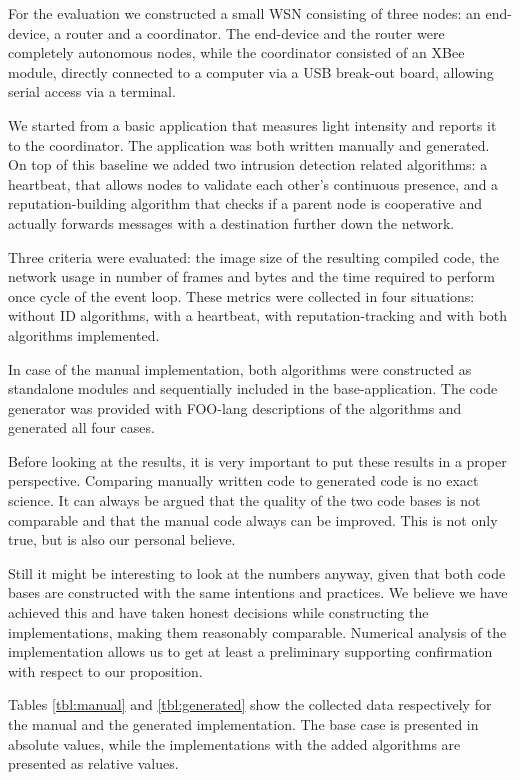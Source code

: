 \documentclass[conference]{IEEEtran}
\begin{document}
For the evaluation we constructed a small WSN consisting of three nodes: an
end-device, a router and a coordinator. The end-device and the router were
completely autonomous nodes, while the coordinator consisted of an XBee module,
directly connected to a computer via a USB break-out board, allowing serial
access via a terminal.

We started from a basic application that measures light intensity and reports
it to the coordinator. The application was both written manually and generated.
On top of this baseline we added two intrusion detection related algorithms: a
heartbeat, that allows nodes to validate each other's continuous presence, and
a reputation-building algorithm that checks if a parent node is cooperative and
actually forwards messages with a destination further down the
network\cite{ganeriwal2008reputation}.

Three criteria were evaluated: the image size of the resulting compiled code,
the network usage in number of frames and bytes and the time required to
perform once cycle of the event loop. These metrics were collected in four
situations: without ID algorithms, with a heartbeat, with reputation-tracking
and with both algorithms implemented.

In case of the manual implementation, both algorithms were constructed as
standalone modules and sequentially included in the base-application. The code
generator was provided with FOO-lang descriptions of the algorithms and
generated all four cases.

Before looking at the results, it is very important to put these results in a
proper perspective. Comparing manually written code to generated code is no
exact science. It can always be argued that the quality of the two code bases
is not comparable and that the manual code always can be improved. This is not
only true, but is also our personal believe.

Still it might be interesting to look at the numbers anyway, given that both
code bases are constructed with the same intentions and practices. We believe
we have achieved this and have taken honest decisions while constructing the
implementations, making them reasonably comparable. Numerical analysis of the
implementation allows us to get at least a preliminary supporting confirmation
with respect to our proposition.

Tables \ref{tbl:manual} and \ref{tbl:generated} show the collected data
respectively for the manual and the generated implementation. The base case is
presented in absolute values, while the implementations with the added
algorithms are presented as relative values.
\end{document}

